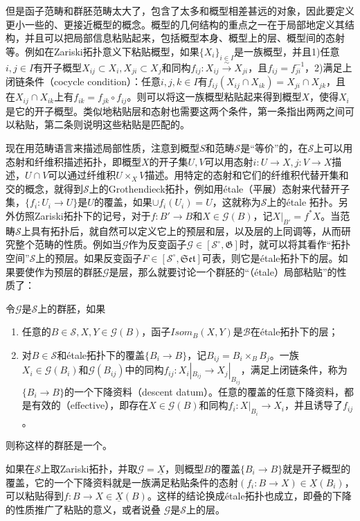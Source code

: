但是函子范畴和群胚范畴太大了，包含了太多和概型相差甚远的对象，因此要定义更小一些的、更接近概型的概念。概型的几何结构的重点之一在于局部地定义其结构，并且可以把局部信息粘贴起来，包括概型本身、概型上的层、概型间的态射等。例如在Zariski拓扑意义下粘贴概型，如果$ \{X_i\}_{i\in I} $是一族概型，并且1)任意$ i, j\in I $有开子概型$ X_{ij}\subset X_i,X_{ji}\subset X_j $和同构$ f_{ij}:X_{ij}\xrightarrow{\sim}X_{ji} $，且$ f_{ij}=f_{ji}^{-1} $，2)满足上闭链条件（cocycle condition）：任意$ i,j,k\in I $有$ f_{ij}(X_{ij}\cap X_{ik})=X_{ji}\cap X_{jk} $，且在$ X_{ij}\cap X_{ik} $上有$ f_{ik}=f_{jk}\circ f_{ij} $。则可以将这一族概型粘贴起来得到概型$ X $，使得$ X_i $是它的开子概型。类似地粘贴层和态射也需要这两个条件，第一条指出两两之间可以粘贴，第二条则说明这些粘贴是匹配的。


现在用范畴语言来描述局部性质，注意到概型$ S $和范畴$ \mathscr{S} $是“等价”的，在$ \mathscr{S} $上可以用态射和纤维积描述拓扑，即概型$ X $的开子集$ U,V $可以用态射$ i:U\to X,j:V\to X $描述，$ U\cap V $可以通过纤维积$ U\times _XV $描述。用特定的态射和它们的纤维积代替开集和交的概念，就得到$ \mathscr{S} $上的Grothendieck拓扑，例如用\'etale（平展）态射来代替开子集，$ \{f_i:U_i\to U\} $是$ U $的覆盖，如果$ \cup f_i(U_i)=U $，这就称为$ \mathscr{S} $上的\'etale 拓扑。另外仿照Zariski拓扑下的记号，对于$ f:B'\to B $和$ X\in\mathscr{G}(B) $，记$ X|_{B'}=f^*X $。当范畴$ \mathscr{S} $上具有拓扑后，就自然可以定义它上的预层和层，以及层的上同调等，从而研究整个范畴的性质。例如当$ \mathscr{G} $作为反变函子$ \mathscr{G}\in [\mathscr{S}^\circ,\mathfrak{G}] $时，就可以将其看作“拓扑空间”$ \mathscr{S} $上的预层。如果反变函子$ F\in[\mathscr{S}^\circ,\mathfrak{Set}] $可表，则它是\'etale拓扑下的层。如果要使作为预层的群胚$ \mathscr{G} $是层，那么就要讨论一个群胚的“（\'etale）局部粘贴”的性质了：
\begin{definition}
	令$ \mathscr{G}$是$ \mathscr{S} $上的群胚，如果
	\begin{enumerate}
		\item 任意的$ B\in\mathscr{S},X,Y\in \mathscr{G}(B) $，函子$ Isom_B(X,Y) $是$ \mathscr{B} $在\'etale拓扑下的层；
		\item 对$ B\in \mathscr{S} $和\'etale拓扑下的覆盖$ \{B_i\to B\} $，记$ B_{ij}=B_i\times_BB_j $。一族$ X_i\in \mathscr{G}(B_i) $和$ \mathscr{G}(B_{ij}) $中的同构$ f_{ij}:X_i|_{B_{ij}}\to X_j|_{B_{ij}} $，满足上闭链条件，称为$ \{B_i\to B\} $的一个下降资料（descent datum）。任意的覆盖的任意下降资料，都是有效的（effective），即存在$ X\in \mathscr{G}(B) $和同构$ f_i:X|_{B_i}\to X_i $，并且诱导了$ f_{ij} $。
	\end{enumerate}
	则称这样的群胚是一个。
\end{definition}
如果在$ \mathscr{S} $上取Zariski拓扑，并取$ \mathscr{G}=\underline{X} $，则概型$ B $的覆盖$ \{B_i\to B\} $就是开子概型的覆盖，它的一个下降资料就是一族满足粘贴条件的态射$ (f_i:B\to X) \in \underline{X}(B_i)$，可以粘贴得到$ f:B\to X \in \underline{X}(B) $。这样的结论换成\'etale拓扑也成立，即叠的下降的性质推广了粘贴的意义，或者说叠 $ \mathscr{G} $是$ \mathscr{S} $上的层。

